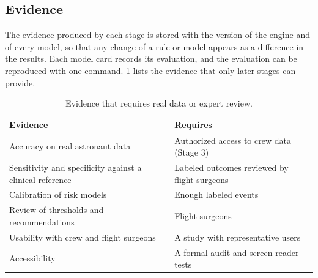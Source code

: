 \subsection{Evidence}
\label{subsec:evidence}

The evidence produced by each stage is stored with the version of the engine and of every model, so that any change of a rule or model appears as a difference in the results. Each model card records its evaluation, and the evaluation can be reproduced with one command. \ref{tab:missing-evidence} lists the evidence that only later stages can provide.

\begin{table}[htbp]
\centering
\vspace{0.8em}
\caption{Evidence that requires real data or expert review.}
\label{tab:missing-evidence}
\small
\begin{tabular}{p{7.0cm}p{7.0cm}}
\hline
\textbf{Evidence} & \textbf{Requires} \\
\hline
Accuracy on real astronaut data & Authorized access to crew data (Stage 3) \\
Sensitivity and specificity against a clinical reference & Labeled outcomes reviewed by flight surgeons \\
Calibration of risk models & Enough labeled events \\
Review of thresholds and recommendations & Flight surgeons \\
Usability with crew and flight surgeons & A study with representative users \\
Accessibility & A formal audit and screen reader tests \\
\hline
\end{tabular}
\vspace{1.2em}
\end{table}
